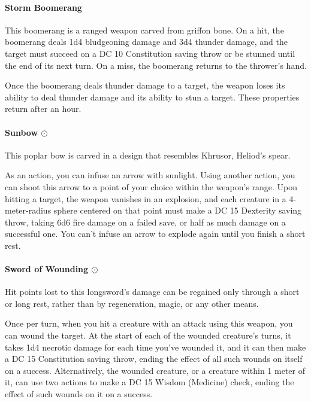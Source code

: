     \paragraph{Storm Boomerang}
        This boomerang is a ranged weapon carved from griffon bone.
        On a hit, the boomerang deals 1d4 bludgeoning damage and 3d4 thunder damage, and the target must succeed on a DC 10 Constitution saving throw or be stunned until the end of its next turn.
        On a miss, the boomerang returns to the thrower's hand.

        Once the boomerang deals thunder damage to a target, the weapon loses its ability to deal thunder damage and its ability to stun a target.
        These properties return after an hour.
    \paragraph{Sunbow $\odot$}
        This poplar bow is carved in a design that resembles Khrusor, Heliod's spear.

        As an action, you can infuse an arrow with sunlight.
        Using another action, you can shoot this arrow to a point of your choice within the weapon's range.
        Upon hitting a target, the weapon vanishes in an explosion, and each creature in a 4-meter-radius sphere centered on that point must make a DC 15 Dexterity saving throw, taking 6d6 fire damage on a failed save, or half as much damage on a successful one.
        You can't infuse an arrow to explode again until you finish a short rest.
    \paragraph{Sword of Wounding $\odot$}
        Hit points lost to this longsword's damage can be regained only through a short or long rest, rather than by regeneration, magic, or any other means.

        Once per turn, when you hit a creature with an attack using this weapon, you can wound the target.
        At the start of each of the wounded creature's turns, it takes 1d4 necrotic damage for each time you've wounded it, and it can then make a DC 15 Constitution saving throw, ending the effect of all such wounds on itself on a success.
        Alternatively, the wounded creature, or a creature within 1 meter of it, can use two actions to make a DC 15 Wisdom (Medicine) check, ending the effect of such wounds on it on a success.
